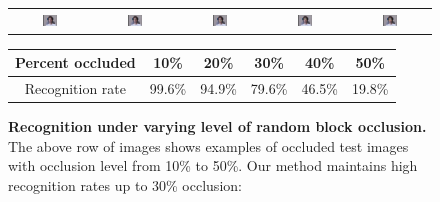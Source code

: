 \renewcommand{\tempwidth}{0.2\textwidth}
\begin{figure}
\centering
\begin{tabular}{@{}c@{}c@{}c@{}c@{}c@{}}
\includegraphics[width=\tempwidth,clip=true]{figures_pami/multipie_occ/occ10.png} &
\includegraphics[width=\tempwidth,clip=true]{figures_pami/multipie_occ/occ20.png} &
\includegraphics[width=\tempwidth,clip=true]{figures_pami/multipie_occ/occ30.png} &
\includegraphics[width=\tempwidth,clip=true]{figures_pami/multipie_occ/occ40.png} &
\includegraphics[width=\tempwidth,clip=true]{figures_pami/multipie_occ/occ50.png}  \\
\end{tabular}
\caption{\small{\bf Recognition under varying level of
random block occlusion.} The above row of images shows examples of occluded test images with occlusion level from 10\% to 50\%. Our method maintains high recognition rates up to 30\% occlusion:}
{
\begin{tabular}{|c|c|c|c|c|c| }
\hline
Percent occluded & 10\% & 20\% & 30\% & 40\% & 50\%  \\
\hline
Recognition rate & 99.6\% & 94.9\% & 79.6\% & 46.5\% & 19.8\% \\
\hline
\end{tabular}
}
\label{fig:multipie-occ-rec}
\end{figure}

